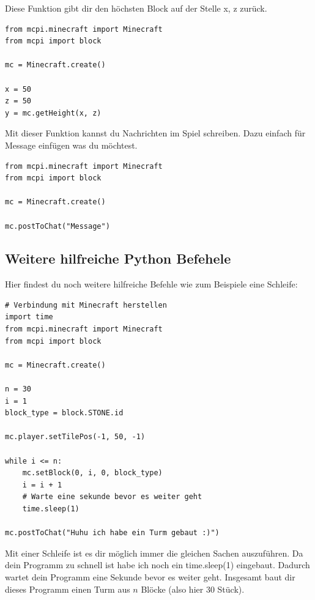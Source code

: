 Diese Funktion gibt dir den höchsten Block auf der Stelle x, z zurück. 

\lstset{language=Python}
\lstset{frame=lines}
\lstset{basicstyle=\footnotesize}
\begin{lstlisting}
from mcpi.minecraft import Minecraft
from mcpi import block

mc = Minecraft.create()

x = 50
z = 50
y = mc.getHeight(x, z)
\end{lstlisting}

Mit dieser Funktion kannst du Nachrichten im Spiel schreiben. Dazu einfach für Message einfügen was du möchtest.

\lstset{language=Python}
\lstset{frame=lines}
\lstset{basicstyle=\footnotesize}
\begin{lstlisting}
from mcpi.minecraft import Minecraft
from mcpi import block

mc = Minecraft.create()

mc.postToChat("Message")
\end{lstlisting}

\subsection{Weitere hilfreiche Python Befehele}
Hier findest du noch weitere hilfreiche Befehle wie zum Beispiele eine Schleife:

\lstset{language=Python}
\lstset{frame=lines}
\lstset{basicstyle=\footnotesize}
\begin{lstlisting}
# Verbindung mit Minecraft herstellen
import time
from mcpi.minecraft import Minecraft
from mcpi import block

mc = Minecraft.create()

n = 30   
i = 1
block_type = block.STONE.id

mc.player.setTilePos(-1, 50, -1)

while i <= n:
	mc.setBlock(0, i, 0, block_type)
	i = i + 1
	# Warte eine sekunde bevor es weiter geht
	time.sleep(1)				

mc.postToChat("Huhu ich habe ein Turm gebaut :)")
\end{lstlisting}
Mit einer Schleife ist es dir möglich immer die gleichen Sachen auszuführen. Da dein Programm zu schnell ist habe ich noch ein time.sleep(1) eingebaut. Dadurch wartet dein Programm eine Sekunde bevor es weiter geht. Insgesamt baut dir dieses Programm einen Turm aus $n$ Blöcke (also hier 30 Stück).

